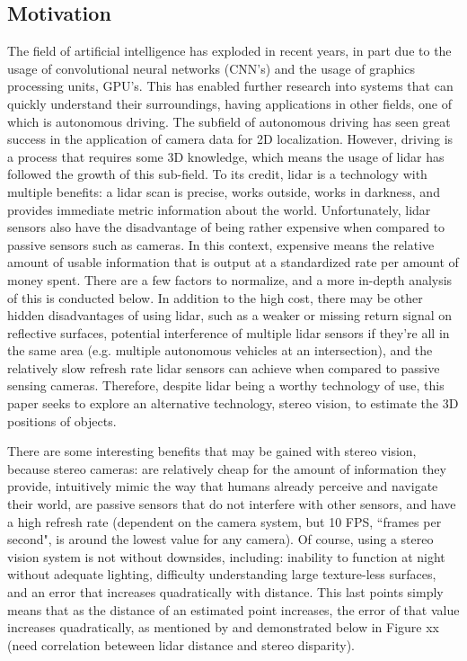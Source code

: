 \subsection{Motivation}
The field of artificial intelligence has exploded in recent years, in part due to the usage of convolutional neural networks (CNN's) and the usage of graphics processing units, GPU's. This has enabled further research into systems that can quickly understand their surroundings, having applications in other fields, one of which is autonomous driving. The subfield of autonomous driving has seen great success in the application of camera data for 2D localization. However, driving is a process that requires some 3D knowledge, which means the usage of lidar has followed the growth of this sub-field. To its credit, lidar is a technology with multiple benefits: a lidar scan is precise, works outside, works in darkness, and provides immediate metric information about the world. Unfortunately, lidar sensors also have the disadvantage of being rather expensive when compared to passive sensors such as cameras. In this context, expensive means the relative amount of usable information that is output at a standardized rate per amount of money spent. There are a few factors to normalize, and a more in-depth analysis of this is conducted below. In addition to the high cost, there may be other hidden disadvantages of using lidar, such as a weaker or missing return signal on reflective surfaces, potential interference of multiple lidar sensors if they're all in the same area (e.g. multiple autonomous vehicles at an intersection), and the relatively slow refresh rate lidar sensors can achieve when compared to passive sensing cameras. Therefore, despite lidar being a worthy technology of use, this paper seeks to explore an alternative technology, stereo vision, to estimate the 3D positions of objects.

There are some interesting benefits that may be gained with stereo vision, because stereo cameras: are relatively cheap for the amount of information they provide, intuitively mimic the way that humans already perceive and navigate their world, are passive sensors that do not interfere with other sensors, and have a high refresh rate (dependent on the camera system, but 10 FPS, ``frames per second", is around the lowest value for any camera). Of course, using a stereo vision system is not without downsides, including: inability to function at night without adequate lighting, difficulty understanding large texture-less surfaces, and an error that increases quadratically with distance. This last points simply means that as the distance of an estimated point increases, the error of that value increases quadratically, as mentioned by \cite{wang_pseudo-lidar_2019} and demonstrated below in Figure xx (need correlation beteween lidar distance and stereo disparity).

